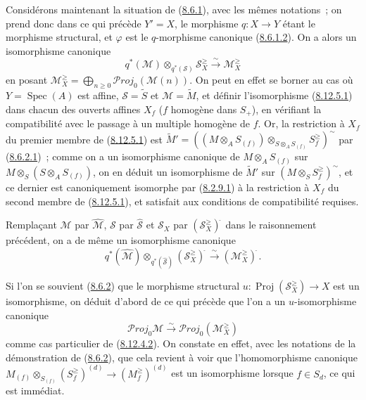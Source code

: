 \begin{env}[8.12.5]
\label{II.8.12.5-fr}
Considérons maintenant la situation de (\hyperref[II.8.6.1-fr]{8.6.1}),
avec les mêmes notations~; on prend donc dans ce qui précède $Y'=X$, le
morphisme $q:X\to Y$ étant le morphisme structural, et $\varphi$ est le
$q$-morphisme canonique (\hyperref[II.8.6.1.2-fr]{8.6.1.2}). On a alors un
isomorphisme canonique
\begin{equation}
\label{II.8.12.5.1-fr}
  q^*(\mathcal{M})\otimes_{q^*(\mathcal{S})}\mathcal{S}_X^{\geq}
  \xrightarrow{\sim}\mathcal{M}_X^{\geq}
\tag{8.12.5.1}
\end{equation}
en posant
$\mathcal{M}_X^{\geq}=\bigoplus_{n\geq0}\mathcal{P}\mathit{roj}_0(\mathcal{M}(n))$.
On peut en effet se borner au cas où $Y=\operatorname{Spec}(A)$ est affine,
$\mathcal{S}=\widetilde{S}$ et $\mathcal{M}=\widetilde{M}$, et définir
l'isomorphisme (\hyperref[II.8.12.5.1-fr]{8.12.5.1}) dans chacun des ouverts
affines $X_f$ ($f$ homogène dans $S_+$), en vérifiant la compatibilité avec le
passage à un multiple homogène de $f$. Or, la restriction à $X_f$ du premier
membre de (\hyperref[II.8.12.5.1-fr]{8.12.5.1}) est
$\widetilde{M}'=
\left((M\otimes_A S_{(f)})
\otimes_{S\otimes_A S_{(f)}}S_f^{\geq}\right)^{\sim}$ par
(\hyperref[II.8.6.2.1-fr]{8.6.2.1})~; comme on a un isomorphisme canonique de
$M\otimes_A S_{(f)}$ sur $M\otimes_S(S\otimes_A S_{(f)})$, on en déduit un
isomorphisme de $\widetilde{M}'$ sur
$\left(M\otimes_S S_f^{\geq}\right)^{\sim}$, et ce dernier est
canoniquement isomorphe par (\hyperref[II.8.2.9.1-fr]{8.2.9.1}) à la
restriction à $X_f$ du second membre de
(\hyperref[II.8.12.5.1-fr]{8.12.5.1}), et satisfait aux conditions de
compatibilité requises.

Remplaçant $\mathcal{M}$ par $\widehat{\mathcal{M}}$, $\mathcal{S}$ par
$\widehat{\mathcal{S}}$ et $\mathcal{S}_X$ par
$(\mathcal{S}_X^{\geq})^{\widehat{\,}}$ dans le raisonnement précédent, on a de
même un isomorphisme canonique
\begin{equation}
\label{II.8.12.5.2-fr}
  q^*(\widehat{\mathcal{M}})
  \otimes_{q^*(\widehat{\mathcal{S}})}(\mathcal{S}_X^{\geq})^{\widehat{\,}}
  \xrightarrow{\sim}(\mathcal{M}_X^{\geq})^{\widehat{\,}}.
\tag{8.12.5.2}
\end{equation}

Si l'on se souvient (\hyperref[II.8.6.2-fr]{8.6.2}) que le morphisme
structural $u:\operatorname{Proj}(\mathcal{S}_X^{\geq})\to X$ est un
isomorphisme, on déduit d'abord de ce qui précède que l'on a un
$u$-isomorphisme canonique
\begin{equation}
\label{II.8.12.5.3-fr}
  \mathcal{P}\mathit{roj}_0\mathcal{M}
  \xrightarrow{\sim}\mathcal{P}\mathit{roj}_0(\mathcal{M}_X^{\geq})
\tag{8.12.5.3}
\end{equation}
comme cas particulier de (\hyperref[II.8.12.4.2-fr]{8.12.4.2}). On constate
en effet, avec les notations de la démonstration de
(\hyperref[II.8.6.2-fr]{8.6.2}), que cela revient à voir que
l'homomorphisme canonique
$M_{(f)}\otimes_{S_{(f)}}(S_f^{\geq})^{(d)}\to(M_f^{\geq})^{(d)}$ est un
isomorphisme lorsque $f\in S_d$, ce qui est immédiat.


\end{env}
